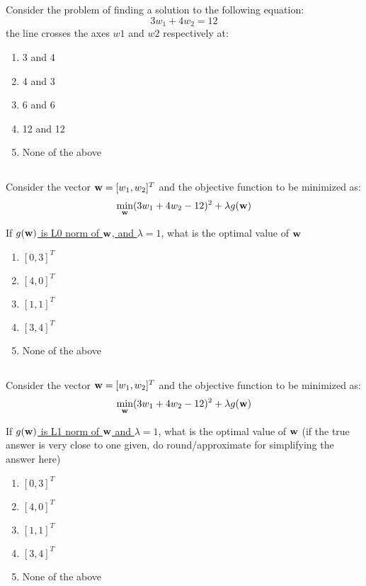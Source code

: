 \begin{frame}
\section{}
  Consider the problem of finding a solution to the
  following equation:
  \[ 3w_1 + 4 w_2 = 12\]
  the line crosses the axes $w1$ and $w2$ respectively at:
    \begin{enumerate}[label=(\Alph*)]
        \item 3 and 4
        \item 4 and 3  %
        \item 6 and 6
        \item 12 and 12
        \item None of the above   %
    \end{enumerate}
\end{frame}

\begin{frame}
\section{}
  Consider the vector ${\bf w} = [w_1, w_2]^T$ and the objective function to be minimized as:
  \[ \min_{\bf w} (3w_1 + 4 w_2 - 12)^2 + \lambda g({\bf w})\]

  If \underline{$g({\bf w})$ is L0 norm of ${\bf w}$, and $\lambda =1$}, what is the optimal value of ${\bf w}$
     \begin{enumerate}[label=(\Alph*)]
       \item $[0,3]^T$  %
      \item $[4,0]^T$   %
      \item $[1,1]^T$
      \item $[3,4]^T$
      \item None of the above   %
     \end{enumerate}
\end{frame}

\begin{frame}
\section{}
  Consider the vector ${\bf w} = [w_1, w_2]^T$ and the objective function to be minimized as:
  \[ \min_{\bf w} (3w_1 + 4 w_2 - 12)^2 + \lambda g({\bf w})\]

  If \underline{$g({\bf w})$ is L1 norm of ${\bf w}$ and $\lambda =1$}, what is the optimal value of ${\bf w}$ (if the true answer is very close to one given, do round/approximate for simplifying the answer here)
    \begin{enumerate}[label=(\Alph*)]
     \item $[0,3]^T$    %
     \item $[4,0]^T$
     \item $[1,1]^T$
     \item $[3,4]^T$
     \item None of the above    %
    \end{enumerate}
\end{frame}

